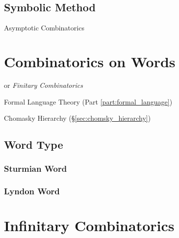\subsection{Symbolic Method}\label{sec:symbolic_method}

Asymptotic Combinatorics



\section{Combinatorics on Words}\label{sec:combinatorics_on_words}

or \emph{Finitary Combinatorics}

Formal Language Theory (Part \ref{part:formal_language})

Chomasky Hierarchy (\S\ref{sec:chomsky_hierarchy})



\subsection{Word Type}\label{sec:word_type}

\subsubsection{Sturmian Word}\label{sec:sturmian_word}

\subsubsection{Lyndon Word}\label{sec:lyndon_word}



\section{Infinitary Combinatorics}\label{sec:infinitary_combinatorics}

